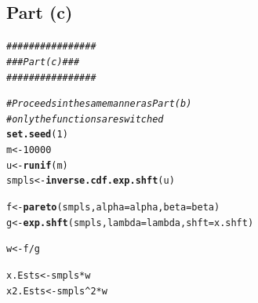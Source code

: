 \documentclass{article}\usepackage[]{graphicx}\usepackage[]{color}
\makeatletter
\newcommand{\hlnum}[1]{\textcolor[rgb]{0.686,0.059,0.569}{#1}}%
\newcommand{\hlcom}[1]{\textcolor[rgb]{0.678,0.584,0.686}{\textit{#1}}}%
\newcommand{\hlopt}[1]{\textcolor[rgb]{0,0,0}{#1}}%
\newcommand{\hlstd}[1]{\textcolor[rgb]{0.345,0.345,0.345}{#1}}%
\newcommand{\hlkwb}[1]{\textcolor[rgb]{0.69,0.353,0.396}{#1}}%
\newcommand{\hlkwc}[1]{\textcolor[rgb]{0.333,0.667,0.333}{#1}}%
\newcommand{\hlkwd}[1]{\textcolor[rgb]{0.737,0.353,0.396}{\textbf{#1}}}%
\newenvironment{kframe}{%
 \def\at@end@of@kframe{}%
 \ifinner\ifhmode%
  \def\at@end@of@kframe{\end{minipage}}%
  \begin{minipage}{\columnwidth}%
 \fi\fi%
 \def\FrameCommand##1{\hskip\@totalleftmargin \hskip-\fboxsep
 \colorbox{shadecolor}{##1}\hskip-\fboxsep
     \hskip-\linewidth \hskip-\@totalleftmargin \hskip\columnwidth}%
 \MakeFramed {\advance\hsize-\width
   \@totalleftmargin\z@ \linewidth\hsize
   \@setminipage}}%
 {\par\unskip\endMakeFramed%
 \at@end@of@kframe}
\newenvironment{knitrout}{}{} %
\makeatother
\begin{document}
\subsection{Part (c)}
\begin{knitrout}
\color{fgcolor}\begin{kframe}
\begin{alltt}
\hlcom{################}
\hlcom{### Part (c) ###}
\hlcom{################}

\hlcom{#Proceeds in the same manner as Part (b)}
\hlcom{#only the functions are switched}
\hlkwd{set.seed}\hlstd{(}\hlnum{1}\hlstd{)}
\hlstd{m}  \hlkwb{<-} \hlnum{10000}
\hlstd{u} \hlkwb{<-} \hlkwd{runif}\hlstd{(m)}
\hlstd{smpls} \hlkwb{<-} \hlkwd{inverse.cdf.exp.shft}\hlstd{(u)}

\hlstd{f} \hlkwb{<-} \hlkwd{pareto}\hlstd{(smpls,} \hlkwc{alpha} \hlstd{= alpha,} \hlkwc{beta} \hlstd{= beta)}
\hlstd{g} \hlkwb{<-} \hlkwd{exp.shft}\hlstd{(smpls,} \hlkwc{lambda} \hlstd{= lambda,} \hlkwc{shft} \hlstd{= x.shft)}

\hlstd{w} \hlkwb{<-} \hlstd{f} \hlopt{/} \hlstd{g}

\hlstd{x.Ests}  \hlkwb{<-} \hlstd{smpls}\hlopt{*}\hlstd{w}
\hlstd{x2.Ests} \hlkwb{<-} \hlstd{smpls}\hlopt{^}\hlnum{2}\hlopt{*}\hlstd{w}


\end{alltt}
\end{kframe}
\end{knitrout}
\end{document}
